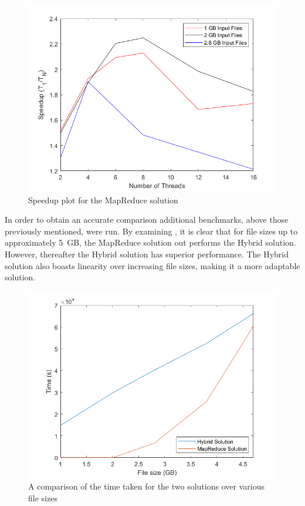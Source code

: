 \documentclass[12pt,twocolumn]{witseiepaper}
\begin{document}
\begin{figure}[h]
	\centering
	\includegraphics[width=1\columnwidth]{mapReduceSpeedup.png}
	\caption{Speedup plot for the MapReduce solution}
	\raggedright
	\label{fig:speedUpMR}	
\end{figure}

In order to obtain an accurate comparison additional benchmarks, above those previously mentioned, were run. By examining , it is clear that for file sizes up to approximately 5~GB, the MapReduce solution out performs the Hybrid solution. However, thereafter the Hybrid solution has superior performance. The Hybrid solution also boasts linearity over increasing file sizes, making it a more adaptable solution.

\begin{figure}[h]
	\centering
	\includegraphics[width=1\columnwidth]{comparison.png}
	\caption{A comparison of the time taken for the two solutions over various file sizes}
	\raggedright
	\label{fig:comparison}	
\end{figure}
\end{document}
